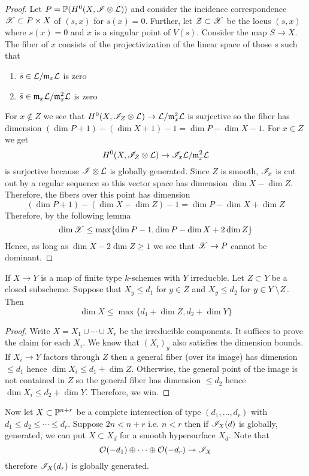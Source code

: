 \documentclass[12pt]{article}
\begin{document}
\begin{proof}
Let $P = \P(H^0(X, \I \ot \L))$ and consider the incidence correspondence $\X \subset P \times X$ of $(s, x)$ for $s(x) = 0$. Further, let $\cZ \subset \X$ be the locus $(s, x)$ where $s(x) = 0$ and $x$ is a singular point of $V(s)$. Consider the map $S \to X$. The fiber of $x$ consists of the projectivization of the linear space of those $s$ such that
\begin{enumerate}
\item $\bar{s} \in \L / \m_x \L$ is zero
\item $\bar{s} \in \m_x \L / \m_x^2 \L$ is zero
\end{enumerate}
For $x \notin Z$ we see that $H^0(X, \I_Z \ot \L) \to \L / \m_x^2 \L$ is surjective so the fiber has dimension $(\dim{P} + 1) - (\dim{X} + 1) - 1 = \dim{P} - \dim{X} - 1$. For $x \in Z$ we get 
\[ H^0(X, \I_Z \ot \L) \to \I_x \L / \m_x^2 \L \]
is surjective because $\I \ot \L$ is globally generated. Since $Z$ is smooth, $\I_x$ is cut out by a regular sequence so this vector space has dimension $\dim{X} - \dim{Z}$. Therefore, the fibers over this point has dimension
\[ (\dim{P} + 1) - (\dim{X} - \dim{Z}) - 1 = \dim{P} - \dim{X} + \dim{Z} \]
Therefore, by the following lemma
\[ \dim{\X} \le \max \{ \dim{P} - 1, \dim{P} - \dim{X} + 2 \dim{Z} \} \]
Hence, as long as $\dim{X} - 2 \dim{Z} \ge 1$ we see that $\X \to P$ cannot be dominant. 
\end{proof}

\begin{lemma}
If $X \to Y$ is a map of finite type $k$-schemes with $Y$ irreducble. Let $Z \subset Y$ be a closed subscheme. Suppose that $X_y \le d_1$ for $y \in Z$ and $X_y \le d_2$ for $y \in Y \sm Z$. Then 
\[ \dim{X} \le \max \{ d_1 + \dim{Z}, d_2 + \dim{Y} \} \]
\end{lemma}

\begin{proof}
Write $X = X_1 \cup \cdots \cup X_r$ be the irreducible components. It suffices to prove the claim for each $X_i$. We know that $(X_i)_y$ also satisfies the dimension bounds. If $X_i \to Y$ factors through $Z$ then a general fiber (over its image) has dimension $\le d_1$ hence $\dim{X_i} \le d_1 + \dim{Z}$. Otherwise, the general point of the image is not contained in $Z$ so the general fiber has dimension $\le d_2$ hence $\dim{X_i} \le d_2 + \dim{Y}$. Therefore, we win. 
\end{proof}


Now let $X \subset \P^{n+r}$ be a complete intersection of type $(d_1, \dots, d_r)$ with $d_1 \le d_2 \le \cdots \le d_r$. Suppose $2n < n + r$ i.e. $n < r$ then if $\I_X(d)$ is globally, generated, we can put $X \subset X_d$ for a smooth hypersurface $X_d$. Note that
\[ \struct{}(-d_1) \oplus \cdots \oplus \struct{}(-d_r) \onto \I_{X} \]
therefore $\I_{X}(d_r)$ is globally generated. 
\end{document}
